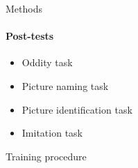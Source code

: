 \documentclass[final,xcolor={cmyk,hyperref}]{beamer}
\begin{document}
\begin{frame}[t]
\begin{columns}[t]
\begin{column}{0.4\linewidth}
\begin{block}{Methods}
\paragraph{Post-tests}
\multicolsep=0pt
\begin{multicols}{2}
\begin{itemize}
\item Oddity task
\item Picture naming task
\columnbreak
\item Picture identification task
\item Imitation task
\end{itemize}
\end{multicols}
\end{block}

\vspace*{0.125in}
\begin{block}{Training procedure}

\vspace*{0.25in}


\end{block}
\end{column}
\end{columns}
\end{frame}
\end{document}
